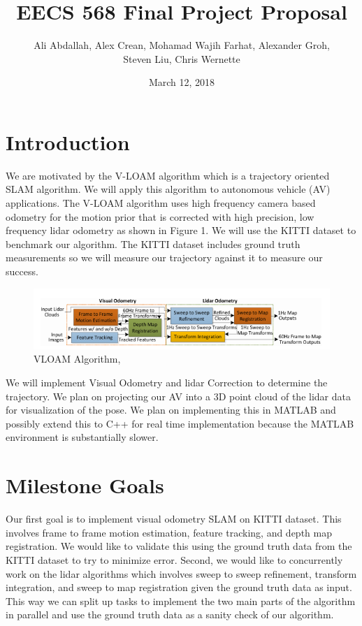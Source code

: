 \documentclass[a4paper,10pt]{article}
\title{EECS 568 Final Project Proposal}
\author{Ali Abdallah, Alex Crean, Mohamad Wajih Farhat, Alexander Groh,  \\  Steven Liu, Chris Wernette}
\date{March 12, 2018}
\begin{document}
\maketitle

\section{Introduction}
We are motivated by the V-LOAM algorithm \cite{zhang2015visual} which is a trajectory oriented SLAM algorithm. We will apply this algorithm to autonomous vehicle (AV) applications. The V-LOAM algorithm uses high frequency camera based odometry for the motion prior that is corrected with high precision, low frequency lidar odometry as shown in Figure 1. We will use the KITTI dataset to benchmark our algorithm. The KITTI dataset includes ground truth measurements so we will measure our trajectory against it to measure our success.

\begin{figure}[h]
\includegraphics[width=12cm]{Algo}
\centering
\caption{VLOAM Algorithm, \cite{zhang2015visual}}
\end{figure}

We will implement Visual Odometry and lidar Correction to determine the trajectory. We plan on projecting our AV into a 3D point cloud of the lidar data for visualization of the pose. We plan on implementing this in MATLAB and possibly extend this to C++ for real time implementation because the MATLAB environment is substantially slower. 


\section{Milestone Goals}
Our first goal is to implement visual odometry SLAM on KITTI dataset. This involves frame to frame motion estimation, feature tracking, and depth map registration. We would like to validate this using the ground truth data from the KITTI dataset to try to minimize error. Second, we would like to concurrently work on the lidar algorithms which involves sweep to sweep refinement, transform integration, and sweep to map registration given the ground truth data as input. This way we can split up tasks to implement the two main parts of the algorithm in parallel and use the ground truth data as a sanity check of our algorithm. 
 
\end{document}

